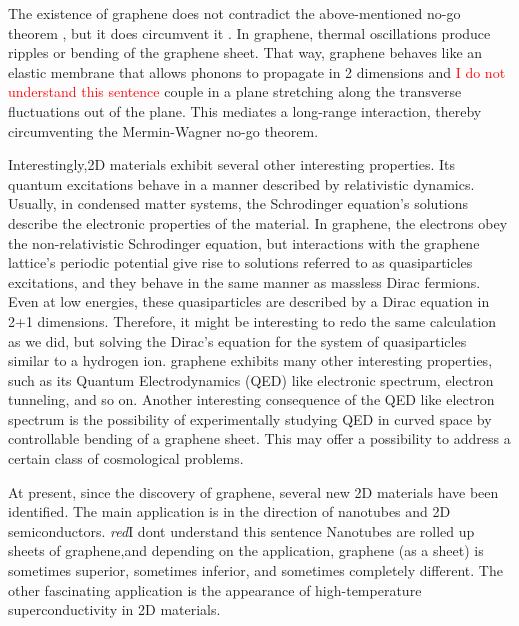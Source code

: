 The existence of graphene does not contradict the above-mentioned no-go theorem \cite{Mermin2}, but it does circumvent it \cite{GrapheneRiples}. In graphene, thermal oscillations produce ripples or bending of the graphene sheet. That way, graphene behaves like an elastic membrane that allows phonons to propagate in 2 dimensions and \textcolor{red}{I do not understand this sentence} couple in a plane stretching along the transverse fluctuations out of the plane. This mediates a long-range interaction, thereby circumventing the Mermin-Wagner no-go theorem. 

Interestingly\cite{Graphene0},2D materials exhibit several other interesting properties. Its quantum excitations behave in a manner described by relativistic dynamics. Usually, in condensed matter systems, the Schrodinger equation's solutions describe the electronic properties of the material. In graphene, the electrons obey the non-relativistic Schrodinger equation, but interactions with the graphene lattice's periodic potential give rise to solutions referred to as
quasiparticles excitations, and they behave in the same manner as massless Dirac fermions. Even at low energies, these quasiparticles are described by a Dirac equation in 2+1 dimensions. Therefore, it might be interesting to redo the same calculation as we did, but solving the Dirac's equation for the system of quasiparticles similar to a hydrogen ion. 
graphene exhibits many other interesting properties\cite{Graphene0}, such as its Quantum Electrodynamics (QED) like electronic spectrum, electron tunneling, and so on. Another interesting consequence of the QED like electron spectrum is the possibility of experimentally studying QED in curved space by controllable bending of a graphene sheet. This may offer a possibility to address a certain class of cosmological problems. 

At present, since the discovery of graphene,
several new 2D materials have
been identified\cite{Many2DMaterials}. The main application is in the direction of nanotubes and 2D semiconductors. 
\textit{red}{I dont understand this sentence}
Nanotubes are rolled up sheets of graphene,and depending on the application, graphene (as a sheet) is sometimes superior, sometimes inferior, and sometimes completely different. The other fascinating application is the appearance of high-temperature superconductivity in 2D materials\cite{2DSuper}.

